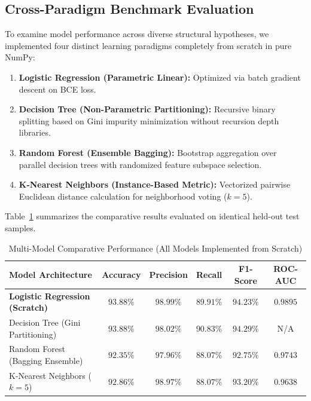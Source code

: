 \documentclass[11pt,a4paper]{article}
\begin{document}
\subsection{Cross-Paradigm Benchmark Evaluation}
To examine model performance across diverse structural hypotheses, we implemented four distinct learning paradigms completely from scratch in pure NumPy:
\begin{enumerate}
    \item \textbf{Logistic Regression (Parametric Linear):} Optimized via batch gradient descent on BCE loss.
    \item \textbf{Decision Tree (Non-Parametric Partitioning):} Recursive binary splitting based on Gini impurity minimization without recursion depth libraries.
    \item \textbf{Random Forest (Ensemble Bagging):} Bootstrap aggregation over parallel decision trees with randomized feature subspace selection.
    \item \textbf{K-Nearest Neighbors (Instance-Based Metric):} Vectorized pairwise Euclidean distance calculation for neighborhood voting ($k = 5$).
\end{enumerate}

Table~\ref{tab:multimodel} summarizes the comparative results evaluated on identical held-out test samples.

\begin{table}[H]
    \centering
    \caption{Multi-Model Comparative Performance (All Models Implemented from Scratch)}
    \label{tab:multimodel}
    \begin{tabular}{lccccc}
        \toprule
        \textbf{Model Architecture} & \textbf{Accuracy} & \textbf{Precision} & \textbf{Recall} & \textbf{F1-Score} & \textbf{ROC-AUC} \\
        \midrule
        \textbf{Logistic Regression (Scratch)} & $\mathbf{93.88\%}$ & $\mathbf{98.99\%}$ & $89.91\%$ & $94.23\%$ & $\mathbf{0.9895}$ \\
        Decision Tree (Gini Partitioning) & $93.88\%$ & $98.02\%$ & $\mathbf{90.83\%}$ & $\mathbf{94.29\%}$ & N/A \\
        Random Forest (Bagging Ensemble) & $92.35\%$ & $97.96\%$ & $88.07\%$ & $92.75\%$ & $0.9743$ \\
        K-Nearest Neighbors ($k=5$) & $92.86\%$ & $98.97\%$ & $88.07\%$ & $93.20\%$ & $0.9638$ \\
        \bottomrule
    \end{tabular}
\end{table}
\end{document}

